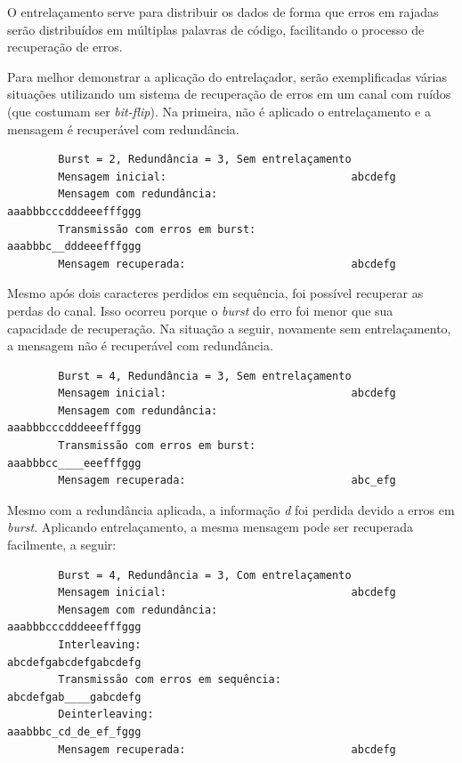	O entrelaçamento serve para distribuir os dados de forma que erros em rajadas serão distribuídos em múltiplas palavras de código, facilitando o processo de recuperação de erros.

	Para melhor demonstrar a aplicação do entrelaçador, serão exemplificadas várias situações utilizando um sistema de recuperação de erros em um canal com ruídos (que costumam ser \textit{bit-flip}). Na primeira, não é aplicado o entrelaçamento e a mensagem é recuperável com redundância.

	\begin{verbatim}
	    Burst = 2, Redundância = 3, Sem entrelaçamento
	    Mensagem inicial:                             abcdefg
	    Mensagem com redundância:                     aaabbbcccdddeeefffggg
	    Transmissão com erros em burst:               aaabbbc__dddeeefffggg
	    Mensagem recuperada:                          abcdefg
	\end{verbatim}

	Mesmo após dois caracteres perdidos em sequência, foi possível recuperar as perdas do canal. Isso ocorreu porque o \textit{burst} do erro foi menor que sua capacidade de recuperação. Na situação a seguir, novamente sem entrelaçamento, a mensagem não é recuperável com redundância.

	\begin{verbatim}
	    Burst = 4, Redundância = 3, Sem entrelaçamento
	    Mensagem inicial:                             abcdefg
	    Mensagem com redundância:                     aaabbbcccdddeeefffggg
	    Transmissão com erros em burst:               aaabbbcc____eeefffggg
	    Mensagem recuperada:                          abc_efg
	\end{verbatim}

	Mesmo com a redundância aplicada, a informação \textit{d} foi perdida devido a erros em \textit{burst}. Aplicando entrelaçamento, a mesma mensagem pode ser recuperada facilmente, a seguir:

	\begin{verbatim}
	    Burst = 4, Redundância = 3, Com entrelaçamento
	    Mensagem inicial:                             abcdefg
	    Mensagem com redundância:                     aaabbbcccdddeeefffggg
	    Interleaving:                                 abcdefgabcdefgabcdefg
	    Transmissão com erros em sequência:           abcdefgab____gabcdefg
	    Deinterleaving:                               aaabbbc_cd_de_ef_fggg
	    Mensagem recuperada:                          abcdefg
	\end{verbatim}

